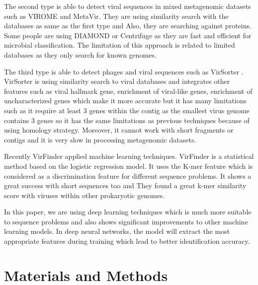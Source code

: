 \documentclass[conference]{IEEEtran}
\begin{document}
The second type is able to detect viral sequences in mixed metagenomic datasets such as VIROME \cite{wommack2012virome} and MetaVir\cite{roux2011metavir}. They are using similarity search with the databases as same as the first type and Also, they are searching against proteins. Some people are using DIAMOND \cite{buchfink2014Diamond} or Centrifuge \cite{kim2016centrifuge} as they are fast and efficient for microbial classification. The limitation of this approach is related to limited databases as they only search for known genomes. 

The third type is able to detect phages and viral sequences such as VirSorter \cite{roux2015virsorter}. VirSorter is using similarity search to viral databases and integrates other features such as viral hallmark gene, enrichment of viral-like genes, enrichment of uncharacterized genes which make it more accurate but it has many limitations such as it require at least 3 genes within the contig as the smallest virus genome contains 3 genes so it has the same limitations as previous techniques because of using homology strategy. Moreover, it cannot work with short fragments or contigs and it is very slow in processing metagenomic datasets. 

Recently VirFinder \cite{ren2017virfinder} applied machine learning techniques. VirFinder is a statistical method based on the logistic regression model. It uses the K-mer feature which is considered as a discrimination feature for different sequence problems. It shows a great success with short sequences too and They found a great k-mer similarity score with viruses within other prokaryotic genomes. 


In this paper, we are using deep learning techniques which is much more suitable to sequence problems and also shows significant improvements to other machine learning models. In deep neural networks, the model will extract the most appropriate features during training which lead to better identification accuracy. 

\section{Materials and Methods}
\end{document}
